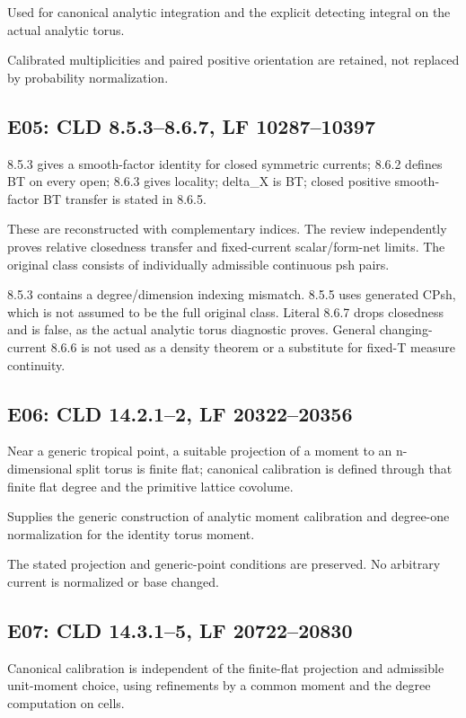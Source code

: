 \documentclass[11pt]{article}
\begin{document}
Used for canonical analytic integration and the explicit detecting integral on the actual analytic torus.

Calibrated multiplicities and paired positive orientation are retained, not replaced by probability normalization.

\subsection*{E05: CLD 8.5.3--8.6.7, LF 10287--10397}

8.5.3 gives a smooth-factor identity for closed symmetric currents; 8.6.2 defines BT on every open; 8.6.3 gives locality; delta\_X is BT; closed positive smooth-factor BT transfer is stated in 8.6.5.

These are reconstructed with complementary indices. The review independently proves relative closedness transfer and fixed-current scalar/form-net limits. The original class consists of individually admissible continuous psh pairs.

8.5.3 contains a degree/dimension indexing mismatch. 8.5.5 uses generated CPsh, which is not assumed to be the full original class. Literal 8.6.7 drops closedness and is false, as the actual analytic torus diagnostic proves. General changing-current 8.6.6 is not used as a density theorem or a substitute for fixed-T measure continuity.

\subsection*{E06: CLD 14.2.1--2, LF 20322--20356}

Near a generic tropical point, a suitable projection of a moment to an n-dimensional split torus is finite flat; canonical calibration is defined through that finite flat degree and the primitive lattice covolume.

Supplies the generic construction of analytic moment calibration and degree-one normalization for the identity torus moment.

The stated projection and generic-point conditions are preserved. No arbitrary current is normalized or base changed.

\subsection*{E07: CLD 14.3.1--5, LF 20722--20830}

Canonical calibration is independent of the finite-flat projection and admissible unit-moment choice, using refinements by a common moment and the degree computation on cells.
\end{document}
